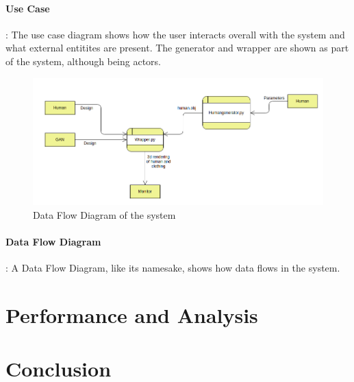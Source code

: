 \documentclass{article}
\begin{document}
\paragraph{Use Case} : The use case diagram shows how the user interacts overall with the system and what external entitites are present. The generator and wrapper are shown as part of the system, although being actors.

\begin{figure}[H]
    \includegraphics[scale=0.5]{images/softwareDiagrams/DFD.png}
    \caption{Data Flow Diagram of the system}
\end{figure}

\paragraph{Data Flow Diagram}: A Data Flow Diagram, like its namesake, shows how data flows in the system. 
\section{Performance and Analysis}



\section{Conclusion}
\printbibliography
\end{document}

